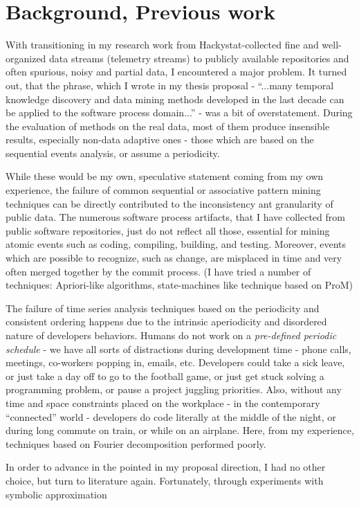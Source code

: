 \documentclass[11pt,oneside]{article}
\numberwithin{equation}{subsection}
\begin{document}
\section{Background, Previous work}
With transitioning in my research work from Hackystat-collected fine and well-organized data
streams (telemetry streams) to publicly available repositories and often spurious, noisy and
partial data, I encountered a major problem. It turned out, that the phrase, which I wrote in my
thesis proposal - ``...many temporal knowledge discovery and data mining methods developed in the
last decade can be applied to the software process domain...'' - was a bit of overstatement. During 
the evaluation of methods on the real data, most of them produce insensible results,
especially non-data adaptive ones - those which are based on the sequential events analysis, or
assume a periodicity.

While these would be my own, speculative statement coming from my own experience, the failure of
common sequential or associative pattern mining techniques can be directly contributed to the
inconsistency ant granularity of public data. The numerous software process artifacts, that I
have collected from public software repositories, just do not reflect all those, essential for
mining atomic events such as coding, compiling, building, and testing.
Moreover, events which are possible to recognize, such as change, are misplaced in time
and very often merged together by the commit process. (I have tried a number of techniques:
Apriori-like algorithms, state-machines like technique based on ProM)

The failure of time series analysis techniques based on the periodicity and consistent ordering
happens due to the intrinsic aperiodicity and disordered nature of developers behaviors.
Humans do not work on a \textit{pre-defined periodic schedule} - we have all sorts of distractions 
during development time - phone calls, meetings, co-workers popping in, emails, etc.
Developers could take a sick leave, or just take a day off to go to the football game,
or just get stuck solving a programming problem, or pause a project juggling priorities.
Also, without any time and space constraints placed on the workplace - in the contemporary
``connected'' world - developers do code literally at the middle of the night, or during
long commute on train, or while on an airplane. Here, from my experience, techniques based on
Fourier decomposition performed poorly.

In order to advance in the pointed in my proposal direction, I had no other choice, but turn to
literature again. Fortunately, through experiments with symbolic approximation 
\end{document}

